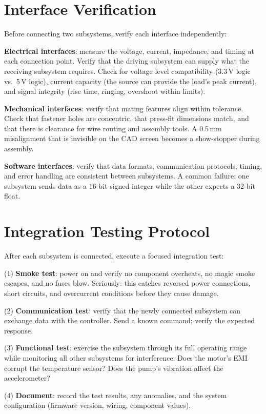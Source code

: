 \documentclass[11pt,letterpaper,twoside,openany]{book}
\begin{document}
\section{Interface Verification}
Before connecting two subsystems, verify each interface independently:

\textbf{Electrical interfaces}: measure the voltage, current, impedance, and timing at each connection point. Verify that the driving subsystem can supply what the receiving subsystem requires. Check for voltage level compatibility (3.3\,V logic vs.\ 5\,V logic), current capacity (the source can provide the load's peak current), and signal integrity (rise time, ringing, overshoot within limits).

\textbf{Mechanical interfaces}: verify that mating features align within tolerance. Check that fastener holes are concentric, that press-fit dimensions match, and that there is clearance for wire routing and assembly tools. A 0.5\,mm misalignment that is invisible on the CAD screen becomes a show-stopper during assembly.

\textbf{Software interfaces}: verify that data formats, communication protocols, timing, and error handling are consistent between subsystems. A common failure: one subsystem sends data as a 16-bit signed integer while the other expects a 32-bit float.

\section{Integration Testing Protocol}
After each subsystem is connected, execute a focused integration test:

(1) \textbf{Smoke test}: power on and verify no component overheats, no magic smoke escapes, and no fuses blow. Seriously: this catches reversed power connections, short circuits, and overcurrent conditions before they cause damage.

(2) \textbf{Communication test}: verify that the newly connected subsystem can exchange data with the controller. Send a known command; verify the expected response.

(3) \textbf{Functional test}: exercise the subsystem through its full operating range while monitoring all other subsystems for interference. Does the motor's EMI corrupt the temperature sensor? Does the pump's vibration affect the accelerometer?

(4) \textbf{Document}: record the test results, any anomalies, and the system configuration (firmware version, wiring, component values).
\end{document}
